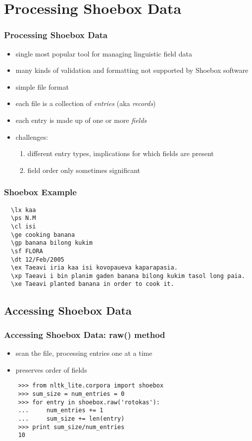 \documentclass{beamer}
\begin{document}
\section{Processing Shoebox Data}

\begin{frame}
\frametitle{Processing Shoebox Data}

\begin{itemize}
\item single most popular tool for managing linguistic field data
\item many kinds of validation and formatting not supported by Shoebox software
\item simple file format
\item each file is a collection of \textit{entries} (aka
  \textit{records})
\item each entry is made up of one or more \textit{fields}
\item challenges:
  \begin{enumerate}
  \item different entry types, implications for which fields are present
  \item field order only sometimes significant
  \end{enumerate}
\end{itemize}
\end{frame}

\begin{frame}[fragile]
\frametitle{Shoebox Example}

\begin{verbatim}
  \lx kaa
  \ps N.M
  \cl isi
  \ge cooking banana
  \gp banana bilong kukim
  \sf FLORA
  \dt 12/Feb/2005
  \ex Taeavi iria kaa isi kovopaueva kaparapasia.
  \xp Taeavi i bin planim gaden banana bilong kukim tasol long paia.
  \xe Taeavi planted banana in order to cook it.
\end{verbatim}
\end{frame}

\subsection{Accessing Shoebox Data}

\begin{frame}[fragile]
\frametitle{Accessing Shoebox Data: raw() method}

\begin{itemize}
\item scan the file, processing entries one at a time
\item preserves order of fields
\end{itemize}

\begin{verbatim}
    >>> from nltk_lite.corpora import shoebox
    >>> sum_size = num_entries = 0
    >>> for entry in shoebox.raw('rotokas'):
    ...     num_entries += 1
    ...     sum_size += len(entry)
    >>> print sum_size/num_entries
    10
\end{verbatim}
\end{frame}
\end{document}
